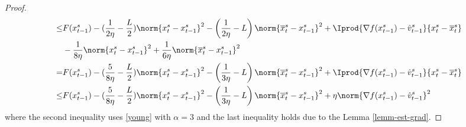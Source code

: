 \begin{proof}
\begin{align}
 \leq & F({x}_{t-1}^s)  -(\frac{1}{2\eta} - \frac{L}{2})\norm{{x}_t^s-x_{t-1}^s}^2- \left(\frac{1}{2\eta}-L\right)\norm{\overline{x}_t^s-x_{t-1}^s}^2+\Iprod{\nabla f(x_{t-1}^s)-\hat{v}_{t-1}^s}{x_t^s - \overline{x}_t^s}\notag\\
 & -\frac{1}{8\eta} \norm{x_t^s-{x}_{t-1}^s}^2 + \frac{1}{6\eta} \norm{\overline{x}_{t}^s-{x}_{t-1}^s}^2\label{eq18}\\
  = &  F({x}_{t-1}^s)  -(\frac{5}{8\eta} - \frac{L}{2})\norm{{x}_t^s-x_{t-1}^s}^2- \left(\frac{1}{3\eta}-L\right)\norm{\overline{x}_t^s-x_{t-1}^s}^2+\Iprod{\nabla f(x_{t-1}^s)-\hat{v}_{t-1}^s}{x_t^s - \overline{x}_t^s}\notag\\
  \leq & F({x}_{t-1}^s)  -(\frac{5}{8\eta} - \frac{L}{2})\norm{{x}_t^s-x_{t-1}^s}^2- \left(\frac{1}{3\eta}-L\right)\norm{\overline{x}_t^s-x_{t-1}^s}^2+\eta \norm{\nabla f(x_{t-1}^s)-\hat{v}_{t-1}^s}^2\label{eq19}
 \end{align}
 where the second inequality uses \eqref{young} with $\alpha = 3$ and the last inequality holds due to the Lemma \ref{lemm-est-grad}.
 

\end{proof}
